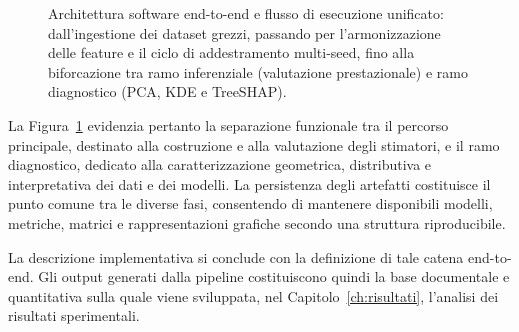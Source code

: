 \begin{figure}[H]
{\begin{tikzpicture}[]
\end{tikzpicture}
}
\caption{Architettura software end-to-end e flusso di esecuzione unificato: dall'ingestione dei dataset grezzi, passando per l'armonizzazione delle feature e il ciclo di addestramento multi-seed, fino alla biforcazione tra ramo inferenziale (valutazione prestazionale) e ramo diagnostico (PCA, KDE e TreeSHAP).}
\label{fig:architettura_software_end_to_end}
\end{figure}
 
La Figura~\ref{fig:architettura_software_end_to_end} evidenzia pertanto la separazione funzionale tra il percorso principale, destinato alla costruzione e alla valutazione degli stimatori, e il ramo diagnostico, dedicato alla caratterizzazione geometrica, distributiva e interpretativa dei dati e dei modelli.
La persistenza degli artefatti costituisce il punto comune tra le diverse fasi, consentendo di mantenere disponibili modelli, metriche, matrici e rappresentazioni grafiche secondo una struttura riproducibile.
 
La descrizione implementativa si conclude con la definizione di tale catena end-to-end.
Gli output generati dalla pipeline costituiscono quindi la base documentale e quantitativa sulla quale viene sviluppata, nel Capitolo~\ref{ch:risultati}, l'analisi dei risultati sperimentali.
